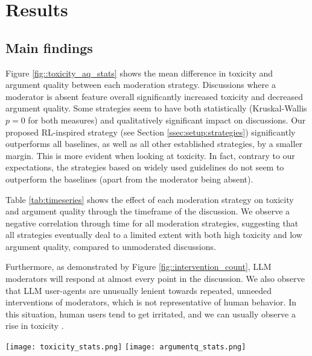 %

\section{Results}

\subsection{Main findings}

Figure \ref{fig::toxicity_aq_stats} shows the mean difference in toxicity and argument quality between each moderation strategy. Discussions where a moderator is absent feature overall significantly increased toxicity and decreased argument quality. Some strategies seem to have both statistically (Kruskal-Wallis $p=0$ for both measures) and qualitatively significant impact on discussions. Our proposed \ac{RL}-inspired strategy (see Section \ref{ssec:setup:strategies}) significantly outperforms all baselines, as well as all other established strategies, by a smaller margin. This is more evident when looking at toxicity. In fact, contrary to our expectations, the strategies based on widely used guidelines do not seem to outperform the baselines (apart from the moderator being absent).

Table \ref{tab:timeseries} shows the effect of each moderation strategy on toxicity and argument quality through the timeframe of the discussion. We observe a negative correlation through time for all moderation strategies, suggesting that all strategies eventually deal to a limited extent with both high toxicity and low argument quality, compared to unmoderated discussions.

Furthermore, as demonstrated by Figure \ref{fig::intervention_count}, \ac{LLM} moderators will respond at almost every point in the discussion. We also observe that \ac{LLM} user-agents are unusually lenient towards repeated, unneeded interventions of moderators, which is not representative of human behavior. In this situation, human users tend to get irritated, and we can usually observe a rise in toxicity \cite{schaffner_community_guidelines, make_reddit_great, proactive_moderation, cresci_pesonalized_interventions}.

\begin{figure*}[t]
    \texttt{[image: toxicity\_stats.png]} \hfill
    \texttt{[image: argumentq\_stats.png]}
	\centering
	\caption{Mean difference of Toxicity (left) and Argument Quality (right) between each moderation strategy. $A[i, j] = 0.3^{***}$ indicates that the strategy $j$ is better than the strategy $i$ for an average of $0.3$ points with $p<0.001$. Each comparison is accompanied by Dunn's posthoc test for multiple comparisons \cite{dunn}, in the form of significance asterisks.}
	\label{fig::toxicity_aq_stats}
\end{figure*}

